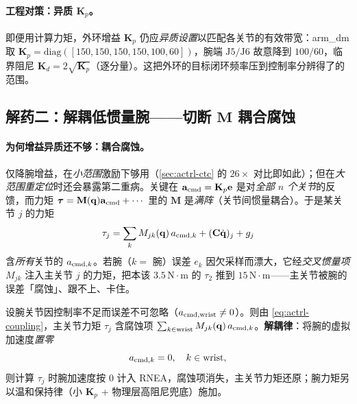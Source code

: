 \paragraph{工程对策：异质 $\mathbf{K}_p$。}
即便用计算力矩，外环增益 $\mathbf{K}_p$ 仍应\emph{异质设置}以匹配各关节的有效带宽：arm\_dm 取 $\mathbf{K}_p=\mathrm{diag}([150,150,150,150,100,60])$，腕端 $\mathrm{J}5/\mathrm{J}6$ 故意降到 $100/60$，临界阻尼 $\mathbf{K}_d=2\sqrt{\mathbf{K}_p}$（逐分量）。这把外环的目标闭环频率压到控制率分辨得了的范围。

\subsection{解药二：解耦低惯量腕——切断 \texorpdfstring{$\mathbf{M}$}{M} 耦合腐蚀}
\label{sec:actrl-decouple}

\paragraph{为何增益异质还不够：耦合腐蚀。}
仅降腕增益，在\emph{小范围}激励下够用（\cref{sec:actrl-ctc} 的 $26\times$ 对比即如此）；但在\emph{大范围重定位}时还会暴露第二重病。关键在 $\mathbf{a}_{\rm cmd}=\mathbf{K}_p\mathbf{e}$ 是对\emph{全部 $n$ 个关节}的反馈，而力矩 $\boldsymbol{\tau}=\mathbf{M}(\mathbf{q})\mathbf{a}_{\rm cmd}+\cdots$ 里的 $\mathbf{M}$ 是\emph{满阵}（关节间惯量耦合）。于是某关节 $j$ 的力矩
\begin{equation}
  \tau_j=\sum_{k}M_{jk}(\mathbf{q})\,a_{{\rm cmd},k}+(\mathbf{C}\dot{\mathbf{q}})_j+g_j
  \label{eq:actrl-coupling}
\end{equation}
含\emph{所有}关节的 $a_{{\rm cmd},k}$。若腕（$k=$ 腕）误差 $e_k$ 因欠采样而漂大，它经\emph{交叉惯量项} $M_{jk}$ 注入主关节 $j$ 的力矩，把本该 $3.5\,\mathrm{N\!\cdot\!m}$ 的 $\tau_2$ 推到 $15\,\mathrm{N\!\cdot\!m}$——主关节被腕的误差「腐蚀」、跟不上、卡住。

\begin{theorem}[腕误差经质量阵耦合腐蚀主关节]
\label{thm:actrl-corruption}
设腕关节因控制率不足而误差不可忽略（$a_{{\rm cmd,wrist}}\ne0$）。则由 \cref{eq:actrl-coupling}，主关节力矩 $\tau_j$ 含腐蚀项 $\sum_{k\in{\rm wrist}}M_{jk}(\mathbf{q})\,a_{{\rm cmd},k}$。\textbf{解耦律}：将腕的虚拟加速度\emph{置零}
\begin{equation}
  a_{{\rm cmd},k}=0,\quad k\in{\rm wrist},
  \label{eq:actrl-decouple}
\end{equation}
则计算 $\tau_j$ 时腕加速度按 $0$ 计入 RNEA，腐蚀项消失，主关节力矩还原；腕力矩另以温和保持律（小 $\mathbf{K}_p$ + 物理层高阻尼兜底）施加。
\end{theorem}

